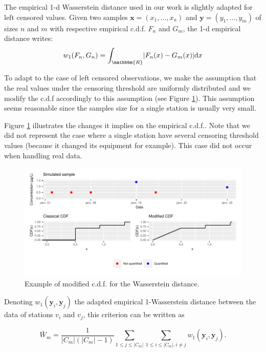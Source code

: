 The empirical 1-d Wasserstein distance used in our work is slightly adapted for left censored values. Given two samples $\bm{x}=(x_1,\dots,x_n)$ and $\bm{y}=(y_1,\dots,y_m)$ of sizes $n$ and $m$ with respective empirical c.d.f. $F_n$ and $G_m$, the 1-d empirical distance writes:
\begin{equation}\label{chp:5:wassdiss}
w_1(F_n,G_n) = \int_{\mathbbm{R}}\lvert F_n(x)-G_m(x) \rvert\mathrm{d}x
\end{equation}

To adapt to the case of left censored observations, we make the assumption that the real values under the censoring threshold are uniformly distributed and we modify the c.d.f accordingly to this assumption (see Figure \ref{fig:mod_dist}). This assumption seems reasonable since  the samples size for a single station is usually very small. 

Figure \ref{fig:mod_dist} illustrates the changes it implies on the empirical c.d.f.. Note that we did not represent the case where a single station have several censoring threshold values (because it changed its equipment for example). This case did not occur when handling real data. %

\begin{figure}[htbp]
    \centering
    \includegraphics{figs/App/Wass_ew.pdf}
    \caption{Example of modified c.d.f. for the Wasserstein distance.}
    \label{fig:mod_dist}
\end{figure}

Denoting $w_1(\mathbf{y}_i,\mathbf{y}_j)$ the adapted empirical 1-Wasserstein distance between the data of stations $v_i$ and $v_j$, this criterion can be written as   

\begin{equation}\label{chp:5:crit2}
    \bar{W}_m = \frac{1}{|C_m|(|C_m|-1)}\sum_{1 \leq j \leq |C_m|}\sum_{1 \leq i \leq |C_m|, i \neq j}w_1(\mathbf{y}_i,\mathbf{y}_j).
\end{equation}

